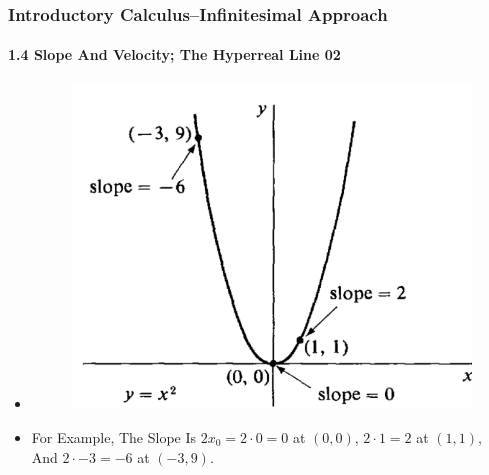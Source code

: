 \begin{frame}
\frametitle{Introductory Calculus--Infinitesimal Approach}
\framesubtitle{1.4 Slope And Velocity; The Hyperreal Line 02}
\label{slide:1.4-02}
\begin{itemize}
\item \begin{figure}\includegraphics[width=.5\textwidth]{images/slope-examples-parabola}\end{figure}
\pause\item For Example, The Slope Is $2x_0=2\cdot 0=0$ at $(0,0)$, $2\cdot 1=2$ at $(1,1)$, And $2\cdot -3=-6$ at $(-3, 9)$.
\end{itemize}
\end{frame}
